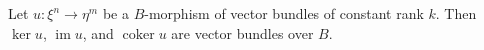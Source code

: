 Let $u: \xi^n \to \eta^m$ be a $B$-morphism of vector bundles of constant rank $k$. Then $\ker u$, $\operatorname{im} u$, and $\operatorname{coker} u$ are vector bundles over $B$.
